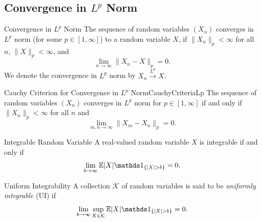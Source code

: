 \subsection{Convergence in \(L^p\) Norm}

\begin{defn}{Convergence in \(L^p\) Norm}{}
	The sequence of random variables \((X_n)\) converges in \(L^p\) norm (for some \(p \in [1, \infty]\)) to a random variable \(X\), if \(\|X_n\|_p < \infty\) for all \(n\), \(\|X\|_p < \infty\), and
	\begin{equation*}
		\lim_{n \to \infty} \|X_n - X\|_p = 0.
	\end{equation*}
	We denote the convergence in \(L^p\) norm by \(X_n \xrightarrow{L^p} X\).
\end{defn}

\begin{prop}{Cauchy Criterion for Convergence in \(L^p\) Norm}{CauchyCriteriaLp}
	The sequence of random variables \((X_n)\) converges in \(L^p\) norm for \(p \in [1, \infty]\) if and only if \(\|X_n\|_p < \infty\) for all \(n\) and
	\begin{equation*}
		\lim_{m,n \to \infty} \|X_m - X_n\|_p = 0.
	\end{equation*}
\end{prop}

\begin{prop}{Integrable Random Variable}{}
	A real-valued random variable \(X\) is integrable if and only if
	\begin{equation}
		\lim_{b \to \infty} \E |X| \I_{\{|X| > b\}} = 0.
		\label{eq:IntegrableRandomVariableCondition}
	\end{equation}
\end{prop}

\begin{defn}{Uniform Integrability}{}
	A collection \(\mathcal{K}\) of random variables is said to be \textit{uniformly integrable} (\(\text{UI}\)) if
	\begin{equation*}
		\lim_{b \to \infty} \sup_{X \in \mathcal{K}} \E |X| \I_{\{|X| > b\}} = 0.
	\end{equation*}
\end{defn}

